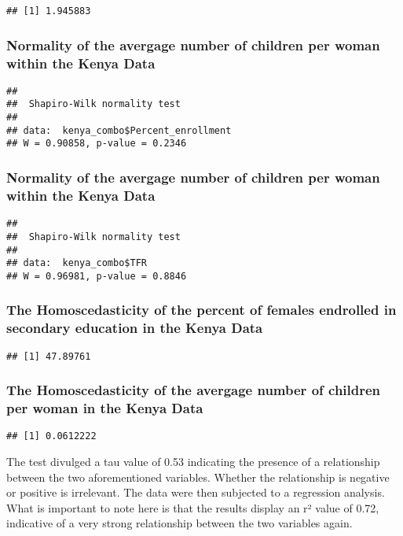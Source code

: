 \documentclass[11pt,]{article}
\begin{document}
\begin{verbatim}
## [1] 1.945883
\end{verbatim}

\subsubsection{Normality of the avergage number of children per woman
within the Kenya
Data}\label{normality-of-the-avergage-number-of-children-per-woman-within-the-kenya-data}

\begin{verbatim}
## 
##  Shapiro-Wilk normality test
## 
## data:  kenya_combo$Percent_enrollment
## W = 0.90858, p-value = 0.2346
\end{verbatim}

\subsubsection{Normality of the avergage number of children per woman
within the Kenya
Data}\label{normality-of-the-avergage-number-of-children-per-woman-within-the-kenya-data-1}

\begin{verbatim}
## 
##  Shapiro-Wilk normality test
## 
## data:  kenya_combo$TFR
## W = 0.96981, p-value = 0.8846
\end{verbatim}

\subsubsection{The Homoscedasticity of the percent of females endrolled
in secondary education in the Kenya
Data}\label{the-homoscedasticity-of-the-percent-of-females-endrolled-in-secondary-education-in-the-kenya-data}

\begin{verbatim}
## [1] 47.89761
\end{verbatim}

\subsubsection{The Homoscedasticity of the avergage number of children
per woman in the Kenya
Data}\label{the-homoscedasticity-of-the-avergage-number-of-children-per-woman-in-the-kenya-data}

\begin{verbatim}
## [1] 0.0612222
\end{verbatim}

The test divulged a tau value of 0.53 indicating the presence of a
relationship between the two aforementioned variables. Whether the
relationship is negative or positive is irrelevant. The data were then
subjected to a regression analysis. What is important to note here is
that the results display an r² value of 0.72, indicative of a very
strong relationship between the two variables again.
\end{document}
